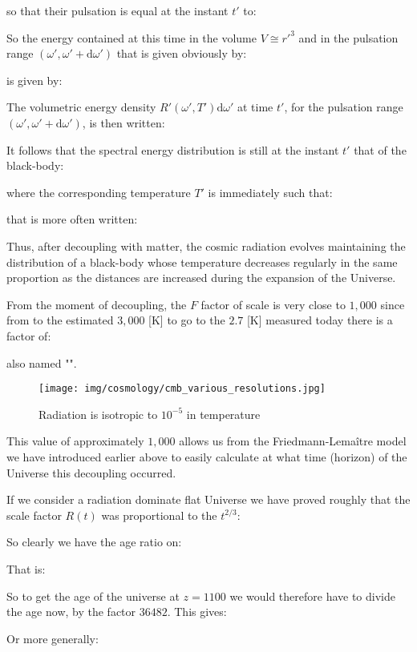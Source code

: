 	so that their pulsation is equal at the instant $t'$ to:
	
	So the energy contained at this time in the volume $V\cong {r'}^3$ and in the pulsation range $(\omega',\omega'+\mathrm{d}\omega')$ that is given obviously by:
	
	is given by:
	
	The volumetric energy density $R'(\omega',T')\mathrm{d}\omega'$ at time $t'$, for the pulsation range $(\omega',\omega'+\mathrm{d}\omega')$, is then written:
	
	It follows that the spectral energy distribution is still at the instant $t'$ that of the black-body:
	
	where the corresponding temperature $T'$ is immediately such that:
	
	that is more often written:
	
	Thus, after decoupling with matter, the cosmic radiation evolves maintaining the distribution of a black-body whose temperature decreases regularly in the same proportion as the distances are increased during the expansion of the Universe.

	From the moment of decoupling, the $F$ factor of scale is very close to $1,000$ since from to the estimated $3,000$ [K] to go to the $2.7$ [K] measured today there is a factor of:
	
	also named "".
	
	\begin{figure}[H]
		\centering
		\texttt{[image: img/cosmology/cmb\_various\_resolutions.jpg]}
		\caption[]{Radiation is isotropic to $10^{-5}$ in temperature}
	\end{figure}
	
	 This value of approximately $1,000$ allows us from the Friedmann-Lemaître model we have introduced earlier above to easily calculate at what time (horizon) of the Universe this decoupling occurred.
	 
	 If we consider a radiation dominate flat Universe we have proved roughly that the scale factor $R(t)$ was proportional to the $t^{2/3}$:
	
	So clearly we have the age ratio on:
	
	That is:
	
	So to get the age of the universe at $z=1100$ we would therefore have to divide the age now, by the factor $36482$. This gives:
	
	Or more generally:
	
